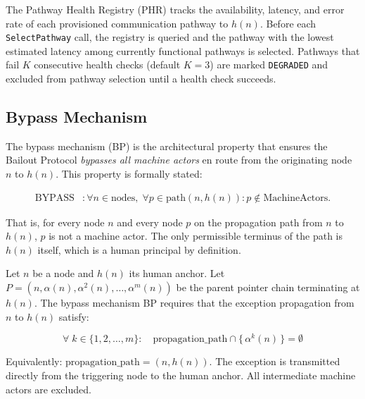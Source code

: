 The Pathway Health Registry (PHR) tracks the availability, latency, and error rate of each provisioned communication pathway to $h(n)$. Before each \texttt{SelectPathway} call, the registry is queried and the pathway with the lowest estimated latency among currently functional pathways is selected. Pathways that fail $K$ consecutive health checks (default $K = 3$) are marked \texttt{DEGRADED} and excluded from pathway selection until a health check succeeds.

\subsection{Bypass Mechanism}
\label{sec:bailout-bypass}

The bypass mechanism (BP) is the architectural property that ensures the Bailout Protocol \emph{bypasses all machine actors} en route from the originating node $n$ to $h(n)$. This property is formally stated:

\begin{align}
\text{BYPASS} &: \forall n \in \text{nodes},\; \forall p \in \text{path}(n, h(n)) : p \notin \text{MachineActors}. \tag{BYPASS}
\end{align}

That is, for every node $n$ and every node $p$ on the propagation path from $n$ to $h(n)$, $p$ is not a machine actor. The only permissible terminus of the path is $h(n)$ itself, which is a human principal by definition.

\begin{definition}
\label{def:bp}

Let $n$ be a node and $h(n)$ its human anchor. Let $P = (n, \alpha(n), \alpha^2(n), \ldots, \alpha^m(n))$ be the parent pointer chain terminating at $h(n)$. The bypass mechanism BP requires that the exception propagation from $n$ to $h(n)$ satisfy:

\begin{equation}
\forall\; k \in \{1, 2, \ldots, m\}:\quad \text{propagation\_path} \cap \{\,\alpha^k(n)\,\} = \emptyset
\label{eq:bp}
\end{equation}

Equivalently: $\text{propagation\_path} = (n, h(n))$. The exception is transmitted directly from the triggering node to the human anchor. All intermediate machine actors are excluded.
\end{definition}

